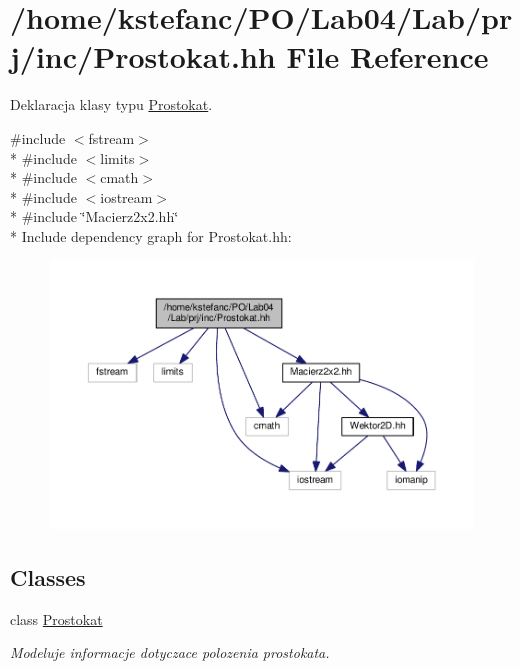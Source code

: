 \hypertarget{_prostokat_8hh}{\section{/home/kstefanc/\+P\+O/\+Lab04/\+Lab/prj/inc/\+Prostokat.hh File Reference}
\label{_prostokat_8hh}
}


Deklaracja klasy typu \hyperlink{class_prostokat}{Prostokat}.  


{\ttfamily \#include $<$fstream$>$}\\*
{\ttfamily \#include $<$limits$>$}\\*
{\ttfamily \#include $<$cmath$>$}\\*
{\ttfamily \#include $<$iostream$>$}\\*
{\ttfamily \#include \char`\"{}Macierz2x2.\+hh\char`\"{}}\\*
Include dependency graph for Prostokat.\+hh\+:\nopagebreak
\begin{figure}[H]
\begin{center}
\leavevmode
\includegraphics[width=350pt]{_prostokat_8hh__incl}
\end{center}
\end{figure}
\subsection*{Classes}
\begin{DoxyCompactItemize}
\item 
class \hyperlink{class_prostokat}{Prostokat}
\begin{DoxyCompactList}\small\item\em Modeluje informacje dotyczace polozenia prostokata. \end{DoxyCompactList}\end{DoxyCompactItemize}
